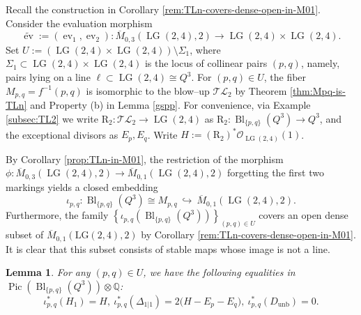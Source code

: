 \documentclass[10pt]{amsart}
\newtheorem{lemma}[theorem]{Lemma}
\theoremstyle{definition}
\newcommand{\Mbar}{\overline{M}}
\newcommand{\Pic}{\operatorname{Pic}}
\newcommand{\LG}{\operatorname{LG}}
\newcommand{\Bl}{\operatorname{Bl}}
\newcommand{\ev}{\operatorname{ev}}
\newcommand{\TL}{\mathcal{TL}}
\DeclareMathOperator{\unb}{unb}
\newcommand{\RL}{\mathrm{R}}
\theoremstyle{plain} %
\begin{document}
Recall the construction in Corollary \ref{rem:TLn-covers-dense-open-in-M01}. Consider the evaluation morphism
\begin{equation*}
\widetilde{\ev}:= (\ev_1,\ev_2)\colon\overline{M}_{0,3}(\LG(2,4),2)\to \LG(2,4)\times \LG(2,4).    
\end{equation*} 
Set $U:=(\LG(2,4)\times \LG(2,4))\setminus \Sigma_1$, where $\Sigma_1\subset \LG(2,4)\times \LG(2,4)$ is the locus of collinear pairs $(p,q)$, namely,  pairs lying on a line
$\ell\subset \LG(2,4)\cong Q^3$.
For $(p,q)\in U$, the fiber $M_{p,q}= f^{-1}(p,q)$ is isomorphic to the blow--up $\TL_2$ by Theorem \ref{thm:Mpq-is-TLn} and Property (b) in Lemma \ref{gspp}. For convenience, via Example \ref{subsec:TL2} we  write $\RL_2\colon \TL_2\to \LG(2,4)$
as $\RL_2\colon\Bl_{\{p,q\}}(Q^3) \rightarrow Q^3$, and the exceptional divisors as $E_p,E_q$. Write $H:=
(\RL_2)^* \mathcal{O}_{\LG(2,4)}(1)$.  


By Corollary \ref{prop:TLn-in-M01}, the restriction of the morphism $\phi\colon\Mbar_{0,3}(\LG(2,4),2)\rightarrow\Mbar_{0,1}(\LG(2,4),2)$ forgetting the first two markings
yields a closed embedding
\begin{equation*}%
\iota_{p,q}:\Bl_{\{p,q\}}(Q^3) \cong M_{p,q}\ \hookrightarrow\ \overline{M}_{0,1}(\LG(2,4),2).    
\end{equation*}
Furthermore, the family 
\(
\left\{ \iota_{p,q} ( \operatorname{Bl}_{\{p,q\}}(Q^3)) \right\}_{(p,q) \in U}
\)
covers an open dense subset of $\overline{M}_{0,1}(\mathrm{LG}(2,4), 2)$  by Corollary \ref{rem:TLn-covers-dense-open-in-M01}. It is clear that this subset consists of stable maps whose image is not a line.

\begin{lemma}\label{lem:restrictions-k1}
For any $(p,q)\in U$, we have the following equalities in $\Pic(\Bl_{\{p,q\}}(Q^3))\otimes\mathbb{Q}$:
\begin{equation}\label{testn}
\iota_{p,q}^*(H_1)=H,\  \iota_{p,q}^*(\Delta_{1|1})=2\bigl(H-E_p-E_q\bigr),\  \iota_{p,q}^*(D_{\unb})=0.
\end{equation}
\end{lemma}
\end{document}
